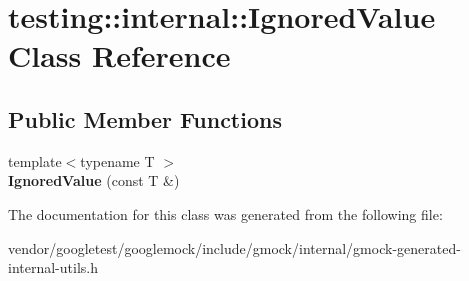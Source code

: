 \hypertarget{classtesting_1_1internal_1_1IgnoredValue}{}\section{testing\+:\+:internal\+:\+:Ignored\+Value Class Reference}
\label{classtesting_1_1internal_1_1IgnoredValue}
\subsection*{Public Member Functions}
\begin{DoxyCompactItemize}
\item 
{\footnotesize template$<$typename T $>$ }\\{\bfseries Ignored\+Value} (const T \&)\hypertarget{classtesting_1_1internal_1_1IgnoredValue_a6c72839c07a9da8d027efb253144bd91}{}\label{classtesting_1_1internal_1_1IgnoredValue_a6c72839c07a9da8d027efb253144bd91}

\end{DoxyCompactItemize}


The documentation for this class was generated from the following file\+:\begin{DoxyCompactItemize}
\item 
vendor/googletest/googlemock/include/gmock/internal/gmock-\/generated-\/internal-\/utils.\+h\end{DoxyCompactItemize}
